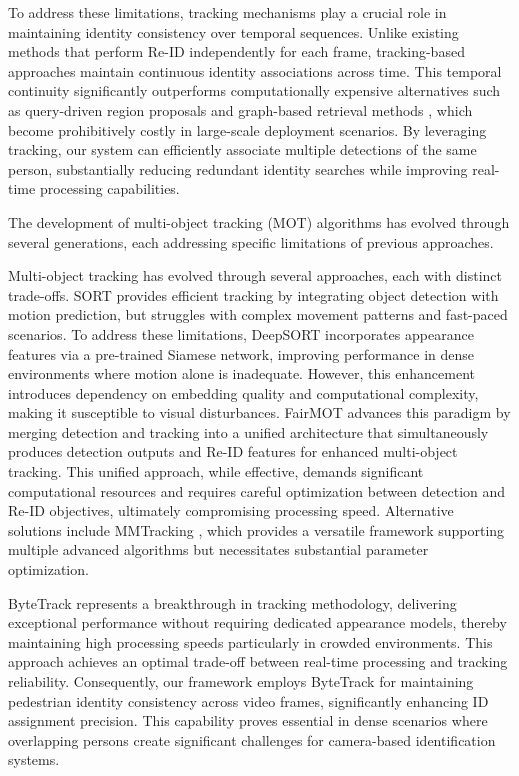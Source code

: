 \documentclass[../main.tex]{subfiles}
\begin{document}
To address these limitations, tracking mechanisms play a crucial role in maintaining identity consistency over temporal sequences. Unlike existing methods that perform Re-ID independently for each frame, tracking-based approaches maintain continuous identity associations across time. This temporal continuity significantly outperforms computationally expensive alternatives such as query-driven region proposals \cite{munjal2019queryguidedendtoendpersonsearch} and graph-based retrieval methods \cite{zhu2025graphbasedapproachesfunctionalitiesretrievalaugmented}, which become prohibitively costly in large-scale deployment scenarios. By leveraging tracking, our system can efficiently associate multiple detections of the same person, substantially reducing redundant identity searches while improving real-time processing capabilities.

The development of multi-object tracking (MOT) algorithms has evolved through several generations, each addressing specific limitations of previous approaches. 

Multi-object tracking has evolved through several approaches, each with distinct trade-offs. SORT \cite{sort} provides efficient tracking by integrating object detection with motion prediction, but struggles with complex movement patterns and fast-paced scenarios. To address these limitations, DeepSORT \cite{deepsort} incorporates appearance features via a pre-trained Siamese network, improving performance in dense environments where motion alone is inadequate. However, this enhancement introduces dependency on embedding quality and computational complexity, making it susceptible to visual disturbances. FairMOT \cite{fairmot} advances this paradigm by merging detection and tracking into a unified architecture that simultaneously produces detection outputs and Re-ID features for enhanced multi-object tracking. This unified approach, while effective, demands significant computational resources and requires careful optimization between detection and Re-ID objectives, ultimately compromising processing speed. Alternative solutions include MMTracking \cite{mmtracking}, which provides a versatile framework supporting multiple advanced algorithms but necessitates substantial parameter optimization.

ByteTrack \cite{bytetrack} represents a breakthrough in tracking methodology, delivering exceptional performance without requiring dedicated appearance models, thereby maintaining high processing speeds particularly in crowded environments. This approach achieves an optimal trade-off between real-time processing and tracking reliability. Consequently, our framework employs ByteTrack for maintaining pedestrian identity consistency across video frames, significantly enhancing ID assignment precision. This capability proves essential in dense scenarios where overlapping persons create significant challenges for camera-based identification systems.
\end{document}
